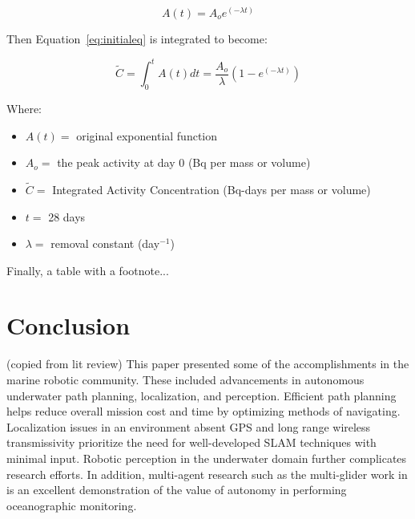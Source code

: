 \documentclass[double,12pt]{beavtex}
\begin{document}
\pagebreak[4]

%
%



\begin{equation}
A(t)=A_{o}e^{(-\lambda t)}
\label{eq:initialeq}
\end{equation}

Then Equation~\ref{eq:initialeq} is integrated to become:

\begin{equation}
\tilde{C}=\int_0^{t}A(t)dt = \frac{A_{o}}{\lambda} (1-e^{(-\lambda t)})
\label{eq:finaleq}
\end{equation}

Where:

\begin{itemize}
\item $A(t) =$ original exponential function
\item $A_{o} =$ the peak activity at day 0 (Bq per mass or volume)
\item $\tilde{C} =$ Integrated Activity Concentration (Bq-days per mass or volume)
\item $t =$ 28 days
\item $\lambda =$ removal constant (day$^{-1}$)
\end{itemize}

Finally, a table with a footnote...


\chapter{Conclusion}

(copied from lit review) This paper presented some of the accomplishments in the marine robotic community. These included advancements in autonomous underwater path planning, localization, and perception. Efficient path planning helps reduce overall mission cost and time by optimizing methods of navigating. Localization issues in an environment absent GPS and long range wireless transmissivity prioritize the need for well-developed SLAM techniques with minimal input. Robotic perception in the underwater domain further complicates research efforts. In addition, multi-agent research such as the multi-glider work in \cite{leonard} is an excellent demonstration of the value of autonomy in performing oceanographic monitoring.
\end{document}
